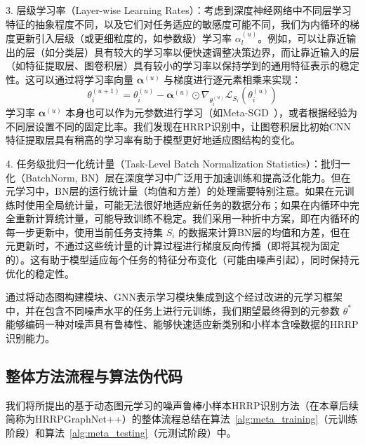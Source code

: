 3.  层级学习率（Layer-wise Learning Rates）：考虑到深度神经网络中不同层学习特征的抽象程度不同，以及它们对任务适应的敏感度可能不同，我们为内循环的梯度更新引入层级（或更细粒度的，如参数级）学习率 $\alpha^{(u)}_l$。例如，可以让靠近输出的层（如分类层）具有较大的学习率以便快速调整决策边界，而让靠近输入的层（如特征提取层、图卷积层）具有较小的学习率以保持学到的通用特征表示的稳定性。这可以通过将学习率向量 $\boldsymbol{\alpha}^{(u)}$ 与梯度进行逐元素相乘来实现：
    \begin{equation}
        \theta_i^{(u+1)} = \theta_i^{(u)} - \boldsymbol{\alpha}^{(u)} \odot \nabla_{\theta_i^{(u)}} \mathcal{L}_{S_i}(\theta_i^{(u)})
        \label{eq:layerwise_lr_update}
    \end{equation}
    学习率 $\boldsymbol{\alpha}^{(u)}$ 本身也可以作为元参数进行学习（如Meta-SGD~\cite{li2017meta}），或者根据经验为不同层设置不同的固定比率。我们发现在HRRP识别中，让图卷积层比初始CNN特征提取层具有稍高的学习率有助于模型更好地适应图结构的变化。

4.  任务级批归一化统计量（Task-Level Batch Normalization Statistics）：批归一化（BatchNorm, BN）层在深度学习中广泛用于加速训练和提高泛化能力。但在元学习中，BN层的运行统计量（均值和方差）的处理需要特别注意。如果在元训练时使用全局统计量，可能无法很好地适应新任务的数据分布；如果在内循环中完全重新计算统计量，可能导致训练不稳定。我们采用一种折中方案，即在内循环的每一步更新中，使用当前任务支持集 $S_i$ 的数据来计算BN层的均值和方差，但在元更新时，不通过这些统计量的计算过程进行梯度反向传播（即将其视为固定的）。这有助于模型适应每个任务的特征分布变化（可能由噪声引起），同时保持元优化的稳定性。

通过将动态图构建模块、GNN表示学习模块集成到这个经过改进的元学习框架中，并在包含不同噪声水平的任务上进行元训练，我们期望最终得到的元参数 $\theta^*$ 能够编码一种对噪声具有鲁棒性、能够快速适应新类别和小样本含噪数据的HRRP识别能力。

\subsection{整体方法流程与算法伪代码}
\label{subsec:algorithm}

我们将所提出的基于动态图元学习的噪声鲁棒小样本HRRP识别方法（在本章后续简称为HRRPGraphNet++）的整体流程总结在算法~\ref{alg:meta_training}（元训练阶段）和算法~\ref{alg:meta_testing}（元测试阶段）中。

